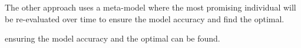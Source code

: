 The other approach uses a meta-model where the most promising individual will be re-evaluated over time to ensure the model accuracy and find the optimal.

ensuring the model accuracy and the optimal can be found. 








